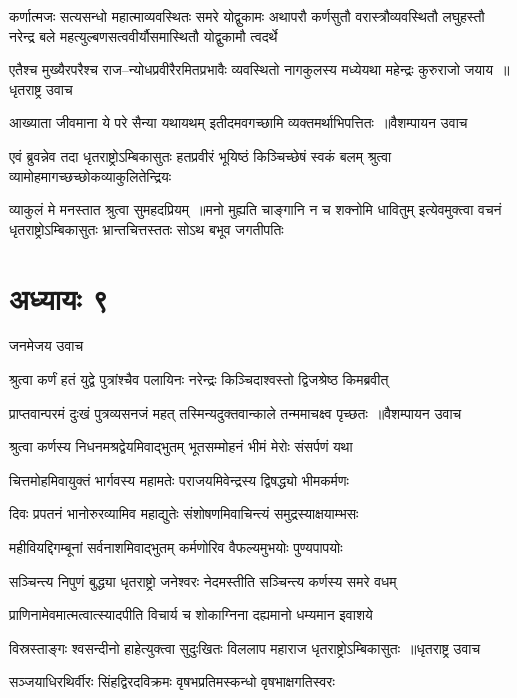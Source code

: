 कर्णात्मजः सत्यसन्धो महात्माव्यवस्थितः समरे योद्वुकामः
\twolineshloka
{अथापरौ कर्णसुतौ वरास्त्रौव्यवस्थितौ लघुहस्तौ नरेन्द्र}
{बले महत्युल्बणसत्ववीर्यौसमास्थितौ योद्वुकामौ त्वदर्थे}


\threelineshloka
{एतैश्च मुख्यैरपरैश्च राज--न्योधप्रवीरैरमितप्रभावैः}
{व्यवस्थितो नागकुलस्य मध्येयथा महेन्द्रः कुरुराजो जयाय ॥धृतराष्ट्र उवाच}
{}


\threelineshloka
{आख्याता जीवमाना ये परे सैन्या यथायथम्}
{इतीदमवगच्छामि व्यक्तमर्थाभिपत्तितः ॥वैशम्पायन उवाच}
{}


\threelineshloka
{एवं ब्रुवन्नेव तदा धृतराष्ट्रोऽम्बिकासुतः}
{हतप्रवीरं भूयिष्ठं किञ्चिच्छेषं स्वकं बलम्}
{श्रुत्वा व्यामोहमागच्छच्छोकव्याकुलितेन्द्रियः}


\threelineshloka
{व्याकुलं मे मनस्तात श्रुत्वा सुमहदप्रियम् ॥मनो मुह्यति चाङ्गानि न च शक्नोमि धावितुम्}
{इत्येवमुक्त्वा वचनं धृतराष्ट्रोऽम्बिकासुतः}
{भ्रान्तचित्तस्ततः सोऽथ बभूव जगतीपतिः}


\chapter{अध्यायः ९}
\twolineshloka
{जनमेजय उवाच}
{}


\twolineshloka
{श्रुत्वा कर्णं हतं युद्वे पुत्रांश्चैव पलायिनः}
{नरेन्द्रः किञ्चिदाश्वस्तो द्विजश्रेष्ठ किमब्रवीत्}


\threelineshloka
{प्राप्तवान्परमं दुःखं पुत्रव्यसनजं महत्}
{तस्मिन्यदुक्तवान्काले तन्ममाचक्ष्व पृच्छतः ॥वैशम्पायन उवाच}
{}


\twolineshloka
{श्रुत्वा कर्णस्य निधनमश्रद्वेयमिवाद्भुतम्}
{भूतसम्मोहनं भीमं मेरोः संसर्पणं यथा}


\twolineshloka
{चित्तमोहमिवायुक्तं भार्गवस्य महामतेः}
{पराजयमिवेन्द्रस्य द्विषद्ध्यो भीमकर्मणः}


\twolineshloka
{दिवः प्रपतनं भानोरुरव्यामिव महाद्युतेः}
{संशोषणमिवाचिन्त्यं समुद्रस्याक्षयाम्भसः}


\twolineshloka
{महीवियद्दिगम्बूनां सर्वनाशमिवाद्भुतम्}
{कर्मणोरिव वैफल्यमुभयोः पुण्यपापयोः}


\twolineshloka
{सञ्चिन्त्य निपुणं बुद्ध्या धृतराष्ट्रो जनेश्वरः}
{नेदमस्तीति सञ्चिन्त्य कर्णस्य समरे वधम्}


\twolineshloka
{प्राणिनामेवमात्मत्वात्स्यादपीति विचार्य च}
{शोकाग्निना दह्यमानो धम्यमान इवाशये}


\threelineshloka
{विस्रस्ताङ्गः श्वसन्दीनो हाहेत्युक्त्वा सुदुःखितः}
{विललाप महाराज धृतराष्ट्रोऽम्बिकासुतः ॥धृतराष्ट्र उवाच}
{}


\twolineshloka
{सञ्जयाधिरथिर्वीरः सिंहद्विरदविक्रमः}
{वृषभप्रतिमस्कन्धो वृषभाक्षगतिस्वरः}


